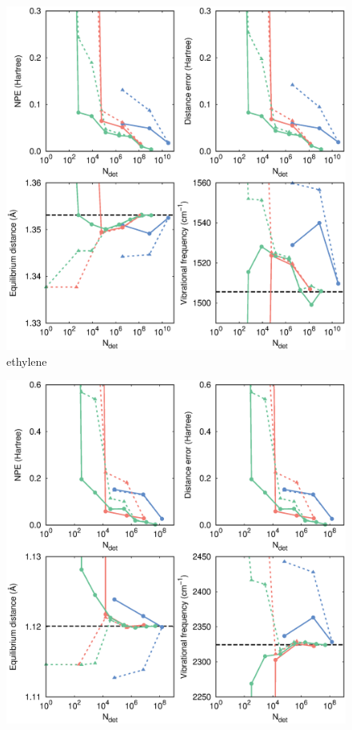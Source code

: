 \documentclass[aip,jcp,preprint,noshowkeys,superscriptaddress]{revtex4-1}
\begin{document}
\begin{figure}%
\includegraphics[width=1.0\linewidth]{plot_pt2_rpt2_ethylene}
\caption{
ethylene
}
\label{fig:plot_pt2_rpt2_ethylene}
\end{figure}

\begin{figure}%
\includegraphics[width=1.0\linewidth]{plot_pt2_rpt2_N2}
\caption{
}
\label{fig:plot_pt2_rpt2_n2}
\end{figure}
\end{document}
